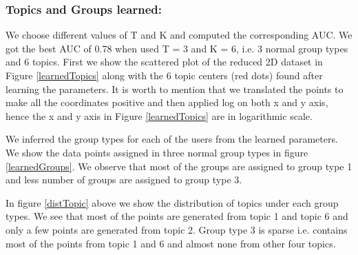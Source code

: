 \documentclass[letterpaper]{article}
\begin{document}
\subsubsection{Topics and Groups learned:} We choose different values of T and K and computed the corresponding AUC. We got the best AUC of 0.78 when used T = 3 and K = 6, i.e. 3 normal group types and 6 topics. First we show the scattered plot of the reduced 2D dataset in Figure \ref{learnedTopics} along with the 6 topic centers (red dots) found after learning the parameters. It is worth to mention that we translated the points to make all the coordinates positive and then applied log on both x and y axis, hence the x and y axis in Figure \ref{learnedTopics} are in logarithmic scale.

We inferred the group types for each of the users from the learned parameters. We show the data points assigned in three normal group types in figure \ref{learnedGroups}. We observe that most of the groups are assigned to group type 1 and less number of groups are assigned to group type 3.

In figure \ref{distTopic} above we show the distribution of topics under each group types. We see that most of the points are generated from topic 1 and topic 6 and only a few points are generated from topic 2. Group type 3 is sparse i.e. contains most of the points from topic 1 and 6 and almost none from other four topics.
\end{document}
